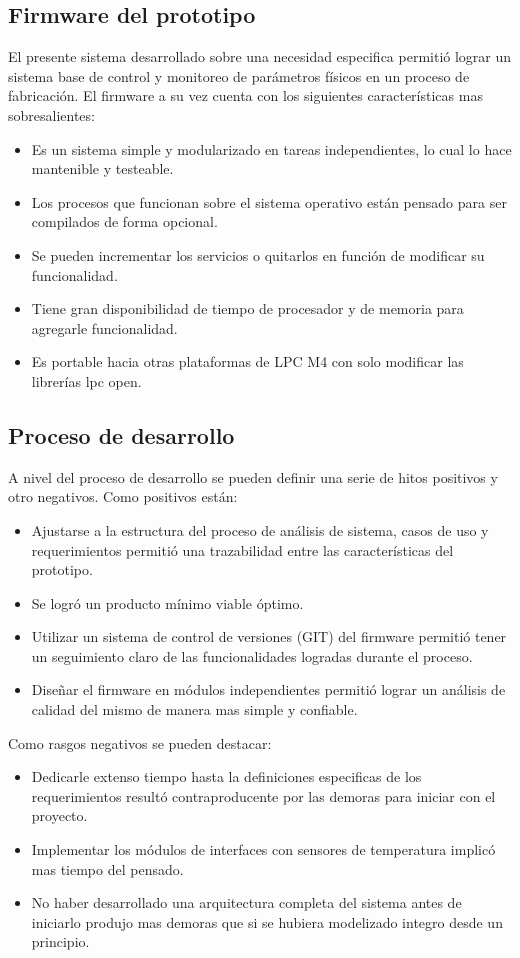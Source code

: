 \subsection{ Firmware del prototipo }
El presente sistema desarrollado sobre una necesidad especifica permitió lograr un sistema base de control y monitoreo de parámetros físicos en un proceso de fabricación. El firmware a su vez cuenta con los siguientes características mas sobresalientes:
\begin{itemize}
\item Es un sistema simple y modularizado en tareas independientes, lo cual lo hace mantenible y testeable.
\item Los procesos que funcionan sobre el sistema operativo están pensado para ser compilados de forma opcional.
\item Se pueden incrementar los servicios o quitarlos en función de modificar su funcionalidad.
\item Tiene gran disponibilidad de tiempo de procesador y de memoria para agregarle funcionalidad.
\item Es portable hacia otras plataformas de LPC M4 con solo modificar las librerías lpc open.
\end{itemize}

\subsection{ Proceso de desarrollo }

A nivel del proceso de desarrollo se pueden definir una serie de hitos positivos y otro negativos. Como positivos están:
\begin{itemize}
\item Ajustarse a la estructura del proceso de análisis de sistema, casos de uso y requerimientos permitió una trazabilidad entre las características del prototipo.
\item Se logró un producto mínimo viable óptimo.
\item Utilizar un sistema de control de versiones (GIT) del firmware permitió tener un seguimiento claro de las funcionalidades logradas durante el proceso.
\item Diseñar el firmware en módulos independientes permitió lograr un análisis de calidad del mismo de manera mas simple y confiable.
\end{itemize}

Como rasgos negativos se pueden destacar:
\begin{itemize}
\item Dedicarle extenso tiempo hasta la definiciones especificas de los requerimientos resultó contraproducente por las demoras para iniciar con el proyecto.
\item Implementar los módulos de interfaces con sensores de temperatura implicó mas tiempo del pensado. 
\item No haber desarrollado una arquitectura completa del sistema antes de iniciarlo produjo mas demoras que si se hubiera modelizado integro desde un principio.
\end{itemize}


